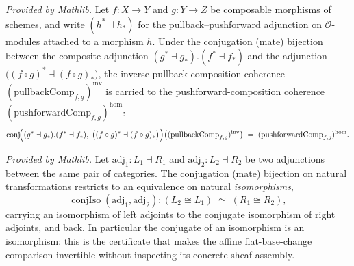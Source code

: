 \begin{lemma}
  \label{lem:conjugateEquiv_pullbackComp_inv_mathlib}
  \mathlibok
  \textit{Provided by Mathlib.}
  Let \(f : X \to Y\) and \(g : Y \to Z\) be composable morphisms of schemes, and write
  \((h^{*} \dashv h_{*})\) for the pullback--pushforward adjunction on \(\mathcal{O}\)-modules
  attached to a morphism \(h\). Under the conjugation (mate) bijection between the composite
  adjunction \((g^{*}\dashv g_{*}) . (f^{*}\dashv f_{*})\) and the adjunction
  \(\bigl((f\circ g)^{*} \dashv (f\circ g)_{*}\bigr)\), the inverse pullback-composition coherence
  \((\mathrm{pullbackComp}_{f,g})^{\mathrm{inv}}\) is carried to the pushforward-composition
  coherence \((\mathrm{pushforwardComp}_{f,g})^{\mathrm{hom}}\):
  \[
    \operatorname{conj}\!\Bigl((g^{*}\dashv g_{*}) . (f^{*}\dashv f_{*}),\;
      \bigl((f\circ g)^{*}\dashv (f\circ g)_{*}\bigr)\Bigr)
      \bigl((\mathrm{pullbackComp}_{f,g})^{\mathrm{inv}}\bigr)
    \;=\; (\mathrm{pushforwardComp}_{f,g})^{\mathrm{hom}}.
  \]
\end{lemma}


\begin{lemma}
  \label{lem:conjugateIsoEquiv_mathlib}
  \mathlibok
  \textit{Provided by Mathlib.}
  Let \(\mathrm{adj}_1 : L_1 \dashv R_1\) and \(\mathrm{adj}_2 : L_2 \dashv R_2\) be two adjunctions
  between the same pair of categories. The conjugation (mate) bijection on natural transformations
  restricts to an equivalence on natural \emph{isomorphisms},
  \[
    \operatorname{conjIso}(\mathrm{adj}_1,\mathrm{adj}_2) :
      (L_2 \cong L_1) \;\simeq\; (R_1 \cong R_2),
  \]
  carrying an isomorphism of left adjoints to the conjugate isomorphism of right adjoints, and back. In
  particular the conjugate of an isomorphism is an isomorphism: this is the certificate that makes the
  affine flat-base-change comparison invertible without inspecting its concrete sheaf assembly.
\end{lemma}

